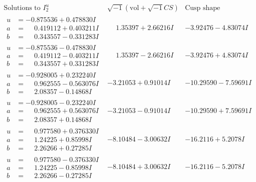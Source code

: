 \documentclass[1p]{elsarticle_modified}
\theoremstyle{definition}
\newcommand{\I}{\sqrt{-1}}
\begin{document}
$$\begin{array}{c|c|c}  
\text{Solutions to }I^u_{2}& \I (\text{vol} + \sqrt{-1}CS) & \text{Cusp shape}\\
 \hline 
\begin{aligned}
u &= -0.875536 + 0.478830 I \\
a &= \phantom{-}0.419112 + 0.403211 I \\
b &= \phantom{-}0.343557 - 0.331283 I\end{aligned}
 & \phantom{-}1.35397 + 2.66216 I & -3.92476 - 4.83074 I \\ \hline\begin{aligned}
u &= -0.875536 - 0.478830 I \\
a &= \phantom{-}0.419112 - 0.403211 I \\
b &= \phantom{-}0.343557 + 0.331283 I\end{aligned}
 & \phantom{-}1.35397 - 2.66216 I & -3.92476 + 4.83074 I \\ \hline\begin{aligned}
u &= -0.928005 + 0.232240 I \\
a &= \phantom{-}0.962555 - 0.563076 I \\
b &= \phantom{-}2.08357 - 0.14868 I\end{aligned}
 & -3.21053 + 0.91014 I & -10.29590 - 7.59691 I \\ \hline\begin{aligned}
u &= -0.928005 - 0.232240 I \\
a &= \phantom{-}0.962555 + 0.563076 I \\
b &= \phantom{-}2.08357 + 0.14868 I\end{aligned}
 & -3.21053 - 0.91014 I & -10.29590 + 7.59691 I \\ \hline\begin{aligned}
u &= \phantom{-}0.977580 + 0.376330 I \\
a &= \phantom{-}1.24225 + 0.85998 I \\
b &= \phantom{-}2.26266 + 0.27285 I\end{aligned}
 & -8.10484 - 3.00632 I & -16.2116 + 5.2078 I \\ \hline\begin{aligned}
u &= \phantom{-}0.977580 - 0.376330 I \\
a &= \phantom{-}1.24225 - 0.85998 I \\
b &= \phantom{-}2.26266 - 0.27285 I\end{aligned}
 & -8.10484 + 3.00632 I & -16.2116 - 5.2078 I \\ \hline\begin{aligned}

\end{aligned}
\end{array}$$
\end{document}
